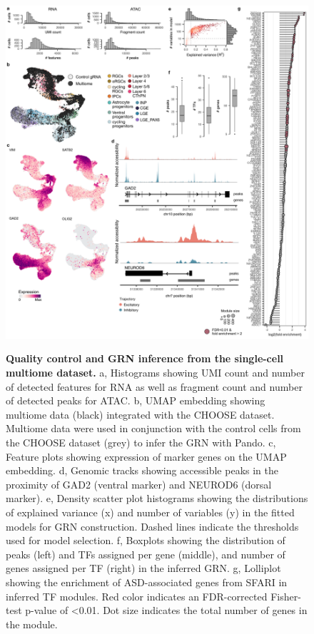 \begin{figure}[h!]
    \centering
	\includegraphics[width=\textwidth]{figures/asd/Figure_S8}
    \label{fig:asdS8}
    \caption{\textbf{Quality control and GRN inference from the single-cell multiome dataset.} 
    a, Histograms showing UMI count and number of detected features for RNA as well as fragment count and number of detected peaks for ATAC. b, UMAP embedding showing multiome data (black) integrated with the CHOOSE dataset. Multiome data were used in conjunction with the control cells from the CHOOSE dataset (grey) to infer the GRN with Pando. c, Feature plots showing expression of marker genes on the UMAP embedding. d, Genomic tracks showing accessible peaks in the proximity of GAD2 (ventral marker) and NEUROD6 (dorsal marker). e, Density scatter plot histograms showing the distributions of explained variance (x) and number of variables (y) in the fitted models for GRN construction. Dashed lines indicate the thresholds used for model selection. f, Boxplots showing the distribution of peaks (left) and TFs assigned per gene (middle), and number of genes assigned per TF (right) in the inferred GRN. g, Lolliplot showing the enrichment of ASD-associated genes from SFARI in inferred TF modules. Red color indicates an FDR-corrected Fisher-test p-value of <0.01. Dot size indicates the total number of genes in the module.}
\end{figure}



